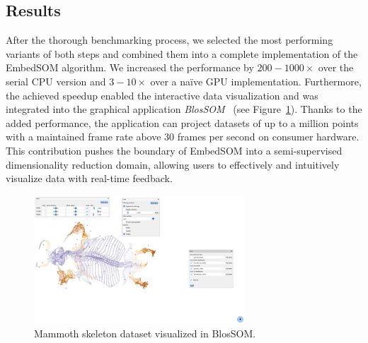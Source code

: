 \subsection{Results}

After the thorough benchmarking process, we selected the most performing variants of both steps and combined them into a complete implementation of the EmbedSOM algorithm. We increased the performance by $200-1000\times$ over the serial CPU version and $3-10\times$ over a na\"{i}ve GPU implementation. Furthermore, the achieved speedup enabled the interactive data visualization and was integrated into the graphical application \emph{BlosSOM}~\cite{molnarova2023throughput} (see Figure~\ref{fig:blossom}). Thanks to the added performance, the application can project datasets of up to a million points with a maintained frame rate above $30$ frames per second on consumer hardware. This contribution pushes the boundary of EmbedSOM into a semi-supervised dimensionality reduction domain, allowing users to effectively and intuitively visualize data with real-time feedback.

\begin{figure}
    \centering
    \includegraphics[width=0.7\textwidth]{img/blossom.png}
    \caption{Mammoth skeleton dataset visualized in BlosSOM.}
    \label{fig:blossom}
\end{figure}


